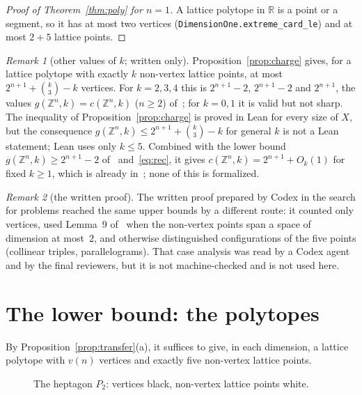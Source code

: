 \documentclass[11pt]{article}
\theoremstyle{definition}
\theoremstyle{remark}
\newtheorem{remark}{Remark}
\newcommand{\Z}{\mathbb Z}
\newcommand{\R}{\mathbb R}
\begin{document}
\begin{proof}[Proof of Theorem~\ref{thm:poly} for $n=1$]
A lattice polytope in $\R$ is a point or a segment, so it has at most two
vertices (\texttt{DimensionOne.extreme\_card\_le}) and at most $2+5$ lattice
points.
\end{proof}

\begin{remark}[other values of $k$; written only]\label{rem:general}
Proposition~\ref{prop:charge} gives, for a lattice polytope with exactly $k$
non-vertex lattice points, at most $2^{n+1}+\binom k3-k$ vertices. For $k=2,3,4$
this is $2^{n+1}-2$, $2^{n+1}-2$ and $2^{n+1}$, the values
$g(\Z^n,k)=c(\Z^n,k)$ ($n\ge2$) of~\cite[Theorem~5]{agm};
for $k=0,1$ it is valid but not sharp. The inequality of
Proposition~\ref{prop:charge} is proved in Lean for every size of $X$, but the
consequence $g(\Z^n,k)\le2^{n+1}+\binom k3-k$ for general $k$ is not a Lean
statement; Lean uses only $k\le5$. Combined with the lower bound
$g(\Z^n,k)\ge2^{n+1}-2$ of~\cite[Lemma~13]{agm} and~\eqref{eq:rec}, it gives
$c(\Z^n,k)=2^{n+1}+O_k(1)$ for fixed $k\ge1$, which is already
in~\cite[Corollary~3.13]{chz}; none of this is formalized.
\end{remark}

\begin{remark}[the written proof]\label{rem:written}
The written proof prepared by Codex in the search for problems reached the same
upper bounds by a different route: it counted only vertices, used
Lemma~9 of~\cite{agm} when the non-vertex points span a space of dimension at
most~$2$, and otherwise distinguished configurations of the five points
(collinear triples, parallelograms). That case analysis was read by a Codex
agent and by the final reviewers, but it is not machine-checked and is not
used here.
\end{remark}

\section{The lower bound: the polytopes}\label{sec:lower}

By Proposition~\ref{prop:transfer}(a), it suffices to give, in each dimension,
a lattice polytope with $v(n)$ vertices and exactly five non-vertex lattice
points.

\begin{figure}
\vspace{-2ex}\centering
{}
\caption{The heptagon $P_2$: vertices black, non-vertex lattice points white.}
\label{fig:hept}
\vspace{-2ex}
\end{figure}
\end{document}

